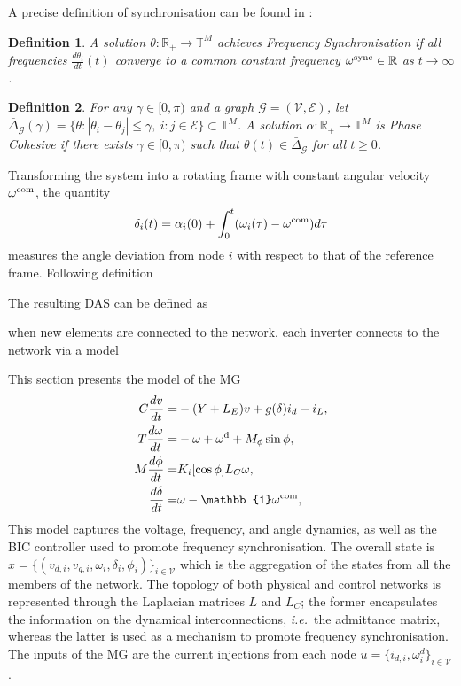 \documentclass[journal, final, letterpaper]{IEEEtran}
\newtheorem{definition}{Definition}[section]
\newcommand{\ts}[1]{{\textnormal{#1}}}
\newcommand{\diff}[2]{{\frac{d #1}{d #2}}}
\newcommand{\ie}{\emph{i.e.}\ }
\newcommand{\Rset}{\mathbb{R}}
\newcommand{\mc}{\mathcal}
\newcommand{\mb}{\mathbf}
\newcommand{\mbb}{\mathbb}
\begin{document}
A precise definition of synchronisation can be found in  \cite{Dorfler2014}:
 \begin{definition}
A solution $ \theta:\Rset_+\to \mbb{T}^M$ achieves \emph{Frequency Synchronisation} if all frequencies $\diff{ \theta_i}{t}(t)$ converge to a common constant frequency $\omega^\ts{sync}\in\Rset$ as $t\to\infty$.
 \label{def:freq_sync}	
 \end{definition}
%
\begin{definition}
For any $\gamma\in[0,\pi)$ and a graph $\mc{G} = (\mc{V},\mc{E})$, let $\bar{\Delta}_{\mc{G}}(\gamma) = \{ \theta\colon | \theta_i -  \theta_j|\leq\gamma,~i:j\in\mc{E}\}\subset\mbb{T}^M$. A solution $\alpha:\Rset_+\to \mbb{T}^M$ is \emph{Phase Cohesive}  if there exists $\gamma\in[0,\pi)$ such that $ \theta(t)\in\bar{\Delta}_\mc{G}$ for all $t\geq 0$.
\label{def:phase_cohes}	
\end{definition}

%



Transforming the system into a rotating frame with constant angular velocity $\omega^\ts{com}$, the quantity 
\[
\delta_i(t) = \alpha_i(0) + \int_0^t(\omega_i(\tau) -\omega^\ts{com})d\tau 
\]
measures the angle deviation from node $i$ with respect to that of the reference frame. Following definition 
\cite{Simpson-Porco2013}


% 
The resulting \ac{DAS} can be defined as






when new elements are connected to the network, each inverter connects to the network via a model 

This section presents the model of the \ac{MG} 
%
\begin{subequations}
\begin{align}
C\diff{v}{t} =& -(Y+L_E) v + g(\delta)i_d - i_L,\label{eq:dyn_global_voltages}\\
T\diff{\omega}{t} =& -\omega+\omega^\ts{d} + M_\phi \sin\mb{\phi},\label{eq:dyn_global_frequency}\\
M\diff{\phi}{t} =& K_i[\cos\phi]L_C\omega,\label{eq:dyn_global_bic}\\
\diff{\delta}{t} =& \omega - \mbb{1}\omega^\ts{com},\label{eq:dyn_global_angle}
\end{align}
\label{eq:dyn_global}	
\end{subequations}
%
This model captures the voltage, frequency, and angle dynamics, as well as the BIC controller used to promote frequency synchronisation. The overall state is $x = \{(v_{d,i},v_{q,i},\omega_i,\delta_i,\phi_i)\}_{i\in\mc{V}}$ which is the aggregation of the states from all the members of the network. The topology of both physical and control networks is represented through the Laplacian matrices $L $ and $L_{C}$; the former encapsulates the information on the dynamical interconnections, \ie the admittance matrix, whereas the latter is used as a mechanism to promote frequency synchronisation. The inputs of the \ac{MG} are the current injections from each node $u = \{i_{d,i},\omega^{d}_{i}\}_{i\in\mc{V}}$.
\end{document}
